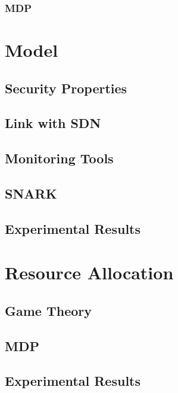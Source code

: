 \documentclass[a4paper, 11pt]{article}
\begin{document}
\subsubsection{MDP}
\cite{Chades2014,Bokani2015,Anupama2014,bellman1957,Wang2013}


\section{Model}
\subsection{Security Properties}
\subsection{Link with SDN}
\subsection{Monitoring Tools}
\subsection{SNARK}
\subsection{Experimental Results}

\section{Resource Allocation}
\subsection{Game Theory}
\subsection{MDP}
\subsection{Experimental Results}




{}

\end{document}
